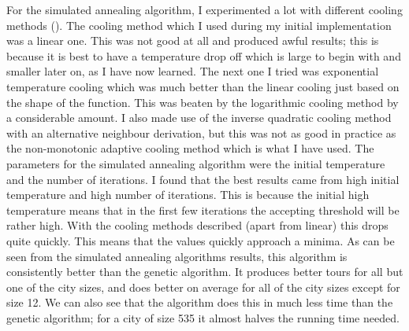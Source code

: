 \documentclass{article}
\begin{document}
For the simulated annealing algorithm, I experimented a lot with different cooling methods (\cite{cooling}). The cooling method which I used during my initial implementation was a linear one. This was not good at all and produced awful results; this is because it is best to have a temperature drop off which is large to begin with and smaller later on, as I have now learned. The next one I tried was exponential temperature cooling which was much better than the linear cooling just based on the shape of the function. This was beaten by the logarithmic cooling method by a considerable amount. I also made use of the inverse quadratic cooling method with an alternative neighbour derivation, but this was not as good in practice as the non-monotonic adaptive cooling method which is what I have used. The parameters for the simulated annealing algorithm were the initial temperature and the number of iterations. I found that the best results came from high initial temperature and high number of iterations. This is because the initial high temperature means that in the first few iterations the accepting threshold will be rather high. With the cooling methods described (apart from linear) this drops quite quickly. This means that the values quickly approach a minima. As can be seen from the simulated annealing algorithms results, this algorithm is consistently better than the genetic algorithm. It produces better tours for all but one of the city sizes, and does better on average for all of the city sizes except for size 12. We can also see that the algorithm does this in much less time than the genetic algorithm; for a city of size 535 it almost halves the running time needed.\\\\

\end{document}
